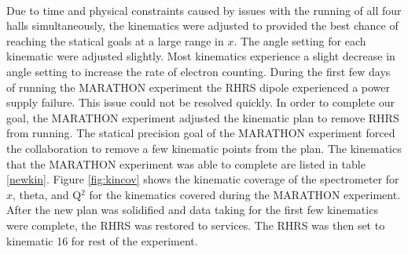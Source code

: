\paragraph{}Due to time and physical constraints caused by issues with the running of all four halls simultaneously, the kinematics were adjusted to provided the best chance of reaching the statical goals at a large range in $x$. The angle setting for each kinematic were adjusted slightly. Most kinematics experience a slight decrease in angle setting to increase the rate of electron counting. During the first few days of running the MARATHON experiment the RHRS dipole experienced a power supply failure. This issue could not be resolved quickly. In order to complete our goal, the MARATHON experiment adjusted the kinematic plan to remove RHRS from running. The statical precision goal of the MARATHON experiment forced the collaboration to remove a few kinematic points from the plan. The kinematics that the MARATHON experiment was able to complete are listed in table \ref{newkin}. Figure \ref{fig:kincov} shows the kinematic coverage of the spectrometer for $x$, theta, and Q$^2$ for the kinematics covered during the MARATHON experiment. After the new plan was solidified and data taking for the first few kinematics were complete, the RHRS was restored to services. The RHRS was then set to kinematic 16 for rest of the experiment.      

